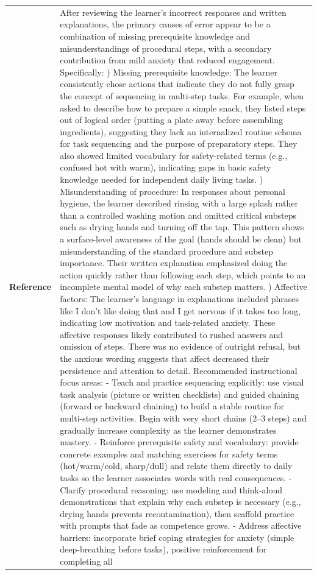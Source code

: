 \begin{longtable}{@{}l p{13cm}@{}}
  \textbf{Reference} & After reviewing the learner's incorrect responses and written explanations, the primary causes of error appear to be a combination of missing prerequisite knowledge and misunderstandings of procedural steps, with a secondary contribution from mild anxiety that reduced engagement. Specifically: \newline 1) Missing prerequisite knowledge: The learner consistently chose actions that indicate they do not fully grasp the concept of sequencing in multi-step tasks. For example, when asked to describe how to prepare a simple snack, they listed steps out of logical order (putting a plate away before assembling ingredients), suggesting they lack an internalized routine schema for task sequencing and the purpose of preparatory steps. They also showed limited vocabulary for safety-related terms (e.g., confused hot with warm), indicating gaps in basic safety knowledge needed for independent daily living tasks. \newline 2) Misunderstanding of procedure: In responses about personal hygiene, the learner described rinsing with a large splash rather than a controlled washing motion and omitted critical substeps such as drying hands and turning off the tap. This pattern shows a surface-level awareness of the goal (hands should be clean) but misunderstanding of the standard procedure and substep importance. Their written explanation emphasized doing the action quickly rather than following each step, which points to an incomplete mental model of why each substep matters. \newline 3) Affective factors: The learner's language in explanations included phrases like I don't like doing that and I get nervous if it takes too long, indicating low motivation and task-related anxiety. These affective responses likely contributed to rushed answers and omission of steps. There was no evidence of outright refusal, but the anxious wording suggests that affect decreased their persistence and attention to detail. \newline Recommended instructional focus areas: \newline - Teach and practice sequencing explicitly: use visual task analysis (picture or written checklists) and guided chaining (forward or backward chaining) to build a stable routine for multi-step activities. Begin with very short chains (2--3 steps) and gradually increase complexity as the learner demonstrates mastery. \newline - Reinforce prerequisite safety and vocabulary: provide concrete examples and matching exercises for safety terms (hot/warm/cold, sharp/dull) and relate them directly to daily tasks so the learner associates words with real consequences. \newline - Clarify procedural reasoning: use modeling and think-aloud demonstrations that explain why each substep is necessary (e.g., drying hands prevents recontamination), then scaffold practice with prompts that fade as competence grows. \newline - Address affective barriers: incorporate brief coping strategies for anxiety (simple deep-breathing before tasks), positive reinforcement for completing all 
\end{longtable}
